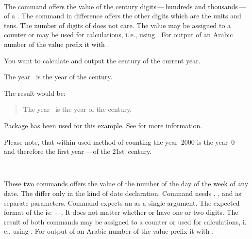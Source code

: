 \begin{Declaration}
  \\%
\end{Declaration}%
%
%
The command  offers
the value of the century digits\,---\,hundreds and thousands\,---\,of a
. The command  in difference offers the other
digits which are the units and tens. The number of digits of  does
not care. The value may be assigned to a counter or may be used for
calculations, i.\,e., using . For
output of an Arabic number of the value prefix it with
.

\begin{Example}
  You want to calculate and output the century of the current year.
\begin{lstcode}
  The year \the\year\ is the year \the\DecadePart{\year}
  of the \engord{\numexpr\CenturyPart{\year}+1\relax} century.
\end{lstcode}
  The result would be:
  \begin{quote}
    The year \the\year\ is the year \the\DecadePart{\year}
    of the \engordnumber{\numexpr\CenturyPart{\year}+1\relax} century.
  \end{quote}
  Package  has been used for this
  example. See \cite{package:engord} for more information.
\end{Example}

Please note, that within used method of counting the
year~2000 is the year~0\,---\,and therefore the first year\,---\,of the
21st~century.%
%
%

\begin{Declaration}
  \\%
\end{Declaration}%
%
%
These two commands offers the value of
the number of the day of the week of any date. The
differ only in the kind of date declaration. Command  needs
, , and  as separate parameters. Command
 expects an  as a single argument. The
expected format of the  is:
\texttt{-}\texttt{-}. It does not matter
whether  or  have one or two digits. The result of
both commands may be assigned to a counter or used for calculations, i.\,e.,
using . For output of an
Arabic number of the value prefix it with .

